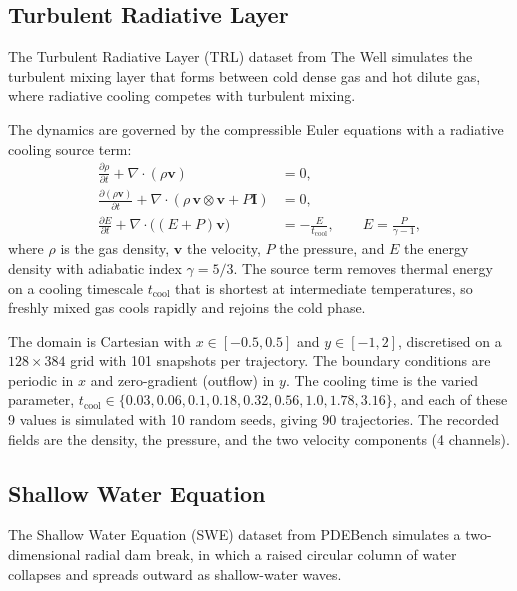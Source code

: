 \documentclass{article}
\begin{document}
\subsection{Turbulent Radiative Layer}
The Turbulent Radiative Layer (TRL) dataset from The Well \citep{ohana2024well, fielding2020multiphase} simulates the turbulent mixing layer that forms between cold dense gas and hot dilute gas, where radiative cooling competes with turbulent mixing.

The dynamics are governed by the compressible Euler equations with a radiative cooling source term:
\begin{align}
  \frac{\partial \rho}{\partial t} + \nabla \cdot (\rho \mathbf{v}) &= 0, \\
  \frac{\partial (\rho \mathbf{v})}{\partial t} + \nabla \cdot (\rho\, \mathbf{v} \otimes \mathbf{v} + P\mathbf{I}) &= 0, \\
  \frac{\partial E}{\partial t} + \nabla \cdot \big((E + P)\mathbf{v}\big) &= -\frac{E}{t_{\mathrm{cool}}}, \qquad E = \frac{P}{\gamma - 1},
\end{align}
where $\rho$ is the gas density, $\mathbf{v}$ the velocity, $P$ the pressure, and $E$ the energy density with adiabatic index $\gamma = 5/3$. The source term removes thermal energy on a cooling timescale $t_{\mathrm{cool}}$ that is shortest at intermediate temperatures, so freshly mixed gas cools rapidly and rejoins the cold phase.

The domain is Cartesian with $x \in [-0.5, 0.5]$ and $y \in [-1, 2]$, discretised on a $128 \times 384$ grid with 101 snapshots per trajectory. The boundary conditions are periodic in $x$ and zero-gradient (outflow) in $y$. The cooling time is the varied parameter, $t_{\mathrm{cool}} \in \{0.03, 0.06, 0.1, 0.18, 0.32, 0.56, 1.0, 1.78, 3.16\}$, and each of these 9 values is simulated with 10 random seeds, giving 90 trajectories. The recorded fields are the density, the pressure, and the two velocity components (4 channels).

\subsection{Shallow Water Equation}
The Shallow Water Equation (SWE) dataset from PDEBench \citep{takamoto2022pdebench} simulates a two-dimensional radial dam break, in which a raised circular column of water collapses and spreads outward as shallow-water waves.
\end{document}
